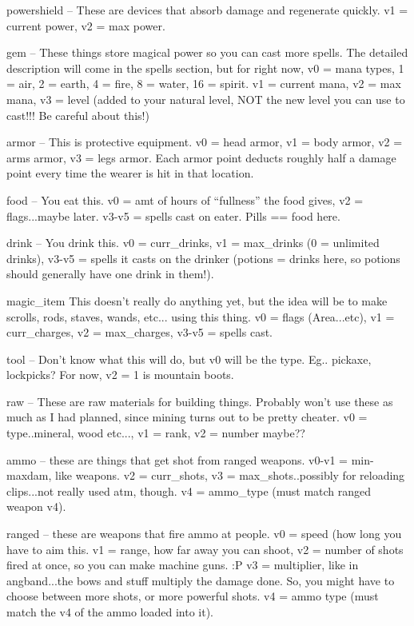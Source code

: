 \bul powershield -- These are devices that absorb damage and
regenerate quickly. v1 = current power, v2 = max power.

\bul gem -- These things store magical power so you can cast more spells.
The detailed description will come in the spells section, but for
right now, v0 = mana types, 1 = air, 2 = earth, 4 = fire, 8 = water,
16 = spirit. v1 = current mana, v2 = max mana, v3 = level (added to
your natural level, NOT the new level you can use to cast!!! Be
careful about this!)

\bul armor -- This is protective equipment. v0 = head armor, v1 = body
armor, v2 = arms armor, v3 = legs armor. Each armor point deducts
roughly half a damage point every time the wearer is hit in that
location.

\bul food -- You eat this. v0 = amt of hours of ``fullness'' the food
gives, v2 = flags...maybe later. v3-v5 = spells cast on eater. Pills
== food here.

\bul drink -- You drink this. v0 = curr\_drinks, v1 = max\_drinks (0 =
unlimited drinks), v3-v5 = spells it casts on the drinker (potions =
drinks here, so potions should generally have one drink in them!).

\bul magic\_item This doesn't really do anything yet, but the idea
will be to make scrolls, rods, staves, wands, etc... using this
thing. v0 = flags (Area...etc), v1 = curr\_charges, v2 = max\_charges,
v3-v5 = spells cast.

\bul tool -- Don't know what this will do, but v0 will be the type. Eg.. 
pickaxe, lockpicks?  For now, v2 = 1 is mountain boots.

\bul raw -- These are raw materials for building things. Probably
won't use these as much as I had planned, since mining turns out to be
pretty cheater. v0 = type..mineral, wood etc..., v1 = rank, v2 = number maybe??

\bul ammo -- these are things that get shot from ranged weapons. v0-v1
= min-maxdam, like weapons. v2 = curr\_shots, v3 =
max\_shots..possibly for reloading clips...not really used atm,
though. v4 = ammo\_type (must match ranged weapon v4).

\bul ranged -- these are weapons that fire ammo at people. v0 = speed
(how long you have to aim this. v1 = range, how far away you can
shoot, v2 = number of shots fired at once, so you can make machine
guns. :P v3 = multiplier, like in angband...the bows and stuff
multiply the damage done. So, you might have to choose between more
shots, or more powerful shots. v4 = ammo type (must match the v4 of
the ammo loaded into it).

